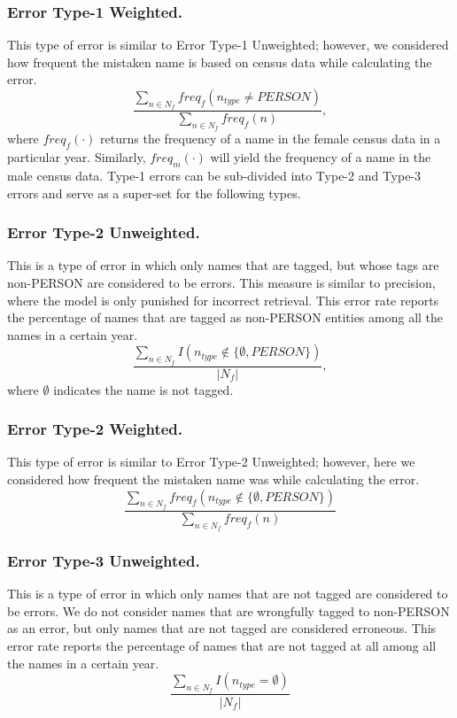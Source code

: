 \subsubsection{Error Type-1 Weighted.} This type of error is similar to Error Type-1 Unweighted; however, we considered how frequent the mistaken name is based on census data while calculating the error.
\[ \frac{\sum_{n \in N_f}freq_f(n_{type} \neq PERSON)}{\sum_{n \in N_f}freq_f(n)},\]
where $freq_f(\cdot)$ returns the frequency of a name in the female census data in a particular year. Similarly, $freq_m(\cdot)$ will yield the frequency of a name in the male census data.
Type-1 errors can be sub-divided into Type-2 and Type-3 errors and serve as a super-set for the following types.
\subsubsection{Error Type-2 Unweighted.} This is a type of error in which only names that are tagged,  but whose tags are non-PERSON are considered to be errors. This measure is similar to precision, where the model is only punished for incorrect retrieval. This error rate reports the percentage of names that are tagged as non-PERSON entities among all the names in a certain year.
\[ \frac{\sum_{n \in N_f}I(n_{type} \notin \{\emptyset,PERSON\})}{|N_f|},\]
where $\emptyset$ indicates the name is not tagged.
\subsubsection{Error Type-2 Weighted.} This type of error is similar to Error Type-2 Unweighted; however, here we considered how frequent the mistaken name was while calculating the error.
\[ \frac{\sum_{n \in N_f}freq_f(n_{type} \notin \{\emptyset,PERSON\})}{\sum_{n \in N_f}freq_f(n)}\]

\subsubsection{Error Type-3 Unweighted.} This is a type of error in which only names that are not tagged are considered to be errors. We do not consider names that are wrongfully tagged to non-PERSON as an error, but only names that are not tagged are considered erroneous. This error rate reports the percentage of names that are not tagged at all among all the names in a certain year.
\[ \frac{\sum_{n \in N_f}I(n_{type} = \emptyset)}{|N_f|}\]

